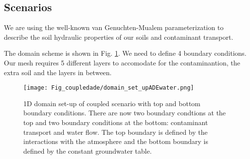 \newpage
\subsection{Scenarios}

We are using the well-known van Genuchten-Mualem parameterization to describe the soil hydraulic properties of our soils and contaminant transport. 

\begin{table}[!h]
\centering
\caption{\label{tab_heat}Material properties needed for scenarios.}
\end{table}

The domain scheme is shown in Fig. \ref{domain}. We need to define 4 boundary conditions. Our mesh requires 5 different layers to accomodate for the contaminantion, the extra soil and the layers in between.

\begin{figure}[!h]
\centering
\texttt{[image: Fig\_coupledade/domain\_set\_upADEwater.png]}
\caption{\label{domain}1D domain set-up of coupled scenario with top and bottom boundary conditions. There are now two boundary condtions at the top and two boundary conditions at the bottom: contaminant transport and water flow. The top boundary is defined by the interactions with the atmosphere and the bottom boundary is defined by the constant groundwater table.}
\end{figure}

